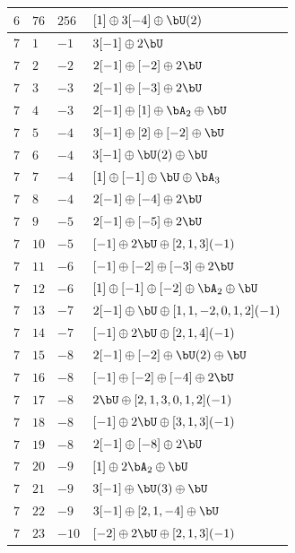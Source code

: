\begin{center}
\begin{longtable}{llll}
 \(6\) & \(76\) & \(256\) & \([1] \oplus 3 [-4] \oplus \bU(2)\) \\
\midrule
 \(7\) & \(1\) & \(-1\) & \(3 [-1] \oplus 2 \bU\) \\
 \(7\) & \(2\) & \(-2\) & \(2 [-1] \oplus [-2] \oplus 2 \bU\) \\
 \(7\) & \(3\) & \(-3\) & \(2 [-1] \oplus [-3] \oplus 2 \bU\) \\
 \(7\) & \(4\) & \(-3\) & \(2 [-1] \oplus [1] \oplus \bA_{2} \oplus \bU\) \\
 \(7\) & \(5\) & \(-4\) & \(3 [-1] \oplus [2] \oplus [-2] \oplus \bU\) \\
 \(7\) & \(6\) & \(-4\) & \(3 [-1] \oplus \bU(2) \oplus \bU\) \\
 \(7\) & \(7\) & \(-4\) & \([1] \oplus [-1] \oplus \bU \oplus \bA_{3}\) \\
 \(7\) & \(8\) & \(-4\) & \(2 [-1] \oplus [-4] \oplus 2 \bU\) \\
 \(7\) & \(9\) & \(-5\) & \(2 [-1] \oplus [-5] \oplus 2 \bU\) \\
 \(7\) & \(10\) & \(-5\) & \([-1] \oplus 2 \bU \oplus [2, 1, 3](-1)\) \\
 \(7\) & \(11\) & \(-6\) & \([-1] \oplus [-2] \oplus [-3] \oplus 2 \bU\) \\
 \(7\) & \(12\) & \(-6\) & \([1] \oplus [-1] \oplus [-2] \oplus \bA_{2} \oplus \bU\) \\
 \(7\) & \(13\) & \(-7\) & \(2 [-1] \oplus \bU \oplus [1, 1, -2, 0, 1, 2](-1)\) \\
 \(7\) & \(14\) & \(-7\) & \([-1] \oplus 2 \bU \oplus [2, 1, 4](-1)\) \\
 \(7\) & \(15\) & \(-8\) & \(2 [-1] \oplus [-2] \oplus \bU(2) \oplus \bU\) \\
 \(7\) & \(16\) & \(-8\) & \([-1] \oplus [-2] \oplus [-4] \oplus 2 \bU\) \\
 \(7\) & \(17\) & \(-8\) & \(2 \bU \oplus [2, 1, 3, 0, 1, 2](-1)\) \\
 \(7\) & \(18\) & \(-8\) & \([-1] \oplus 2 \bU \oplus [3, 1, 3](-1)\) \\
 \(7\) & \(19\) & \(-8\) & \(2 [-1] \oplus [-8] \oplus 2 \bU\) \\
 \(7\) & \(20\) & \(-9\) & \([1] \oplus 2 \bA_{2} \oplus \bU\) \\
 \(7\) & \(21\) & \(-9\) & \(3 [-1] \oplus \bU(3) \oplus \bU\) \\
 \(7\) & \(22\) & \(-9\) & \(3 [-1] \oplus [2, 1, -4] \oplus \bU\) \\
 \(7\) & \(23\) & \(-10\) & \([-2] \oplus 2 \bU \oplus [2, 1, 3](-1)\) \\

\end{longtable}
\end{center}
